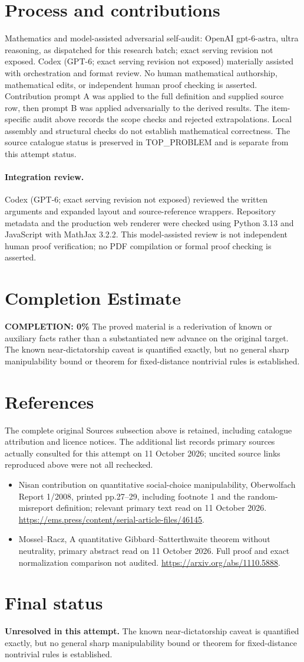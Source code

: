 \documentclass[11pt]{article}
\begin{document}
\section{Process and contributions}
Mathematics and model-assisted adversarial self-audit: OpenAI gpt-6-astra, ultra reasoning, as dispatched for this research batch; exact serving revision not exposed. Codex (GPT-6; exact serving revision not exposed) materially assisted with orchestration and format review. No human mathematical authorship, mathematical edits, or independent human proof checking is asserted.
Contribution prompt A was applied to the full definition and supplied source row, then prompt B was applied adversarially to the derived results. The item-specific audit above records the scope checks and rejected extrapolations. Local assembly and structural checks do not establish mathematical correctness. The source catalogue status is preserved in TOP\_PROBLEM and is separate from this attempt status.
\paragraph{Integration review.} Codex (GPT-6; exact serving revision not exposed) reviewed the written arguments and expanded layout and source-reference wrappers. Repository metadata and the production web renderer were checked using Python 3.13 and JavaScript with MathJax 3.2.2. This model-assisted review is not independent human proof verification; no PDF compilation or formal proof checking is asserted.

\section{Completion Estimate}
\noindent\textbf{COMPLETION: 0\%}
The proved material is a rederivation of known or auxiliary facts rather than a substantiated new advance on the original target. The known near-dictatorship caveat is quantified exactly, but no general sharp manipulability bound or theorem for fixed-distance nontrivial rules is established.
\section{References}
The complete original Sources subsection above is retained, including catalogue attribution and licence notices. The additional list records primary sources actually consulted for this attempt on 11 October 2026; uncited source links reproduced above were not all rechecked.
\begin{itemize}
\item Nisan contribution on quantitative social-choice manipulability, Oberwolfach Report 1/2008, printed pp.27--29, including footnote 1 and the random-misreport definition; relevant primary text read on 11 October 2026. \url{https://ems.press/content/serial-article-files/46145}.
\item Mossel--Racz, A quantitative Gibbard--Satterthwaite theorem without neutrality, primary abstract read on 11 October 2026. Full proof and exact normalization comparison not audited. \url{https://arxiv.org/abs/1110.5888}.
\end{itemize}
\section{Final status}
\textbf{Unresolved in this attempt.} The known near-dictatorship caveat is quantified exactly, but no general sharp manipulability bound or theorem for fixed-distance nontrivial rules is established.
\end{document}
